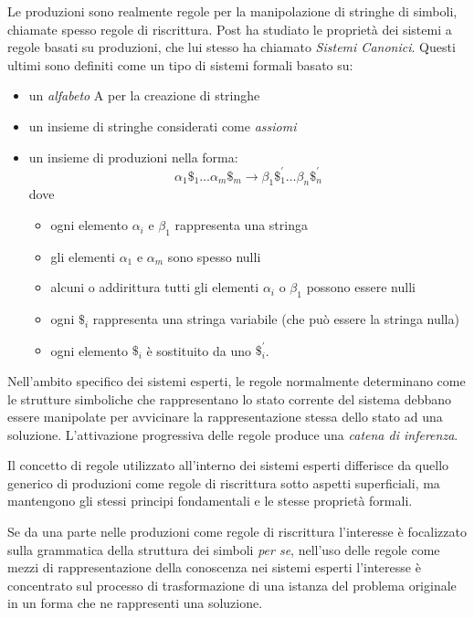 Le produzioni sono realmente regole per la manipolazione di stringhe di simboli, chiamate spesso regole di riscrittura. Post \cite{post1943} ha studiato le proprietà dei sistemi a regole basati su produzioni, che lui stesso ha chiamato \emph{Sistemi Canonici}. Questi ultimi sono definiti come un tipo di sistemi formali basato su:

\begin{itemize}
	\item un \emph{alfabeto} A per la creazione di stringhe
	\item un insieme di stringhe considerati come \emph{assiomi}
	\item un insieme di produzioni nella forma: 
	\[
	\alpha_1\$_1 \dots \alpha_m\$_m \rightarrow \beta_1\$_1^{'} \dots \beta_n\$_n^{'}
	\]	
	dove
	\begin{itemize}
		\item ogni elemento $\alpha_i$ e $\beta_1$ rappresenta una stringa
		\item gli elementi $\alpha_1$ e $\alpha_m$ sono spesso nulli
		\item alcuni o addirittura tutti gli elementi $\alpha_i$ o $\beta_1$ possono essere nulli
		\item ogni $\$_i$ rappresenta una stringa variabile (che può essere la stringa nulla)
		\item ogni elemento $\$_i$ è sostituito da uno $\$_i^{'}$.
	\end{itemize}
\end{itemize}

Nell'ambito specifico dei sistemi esperti, le regole normalmente determinano come le strutture simboliche che rappresentano lo stato corrente del sistema debbano essere manipolate per avvicinare la rappresentazione stessa dello stato ad una soluzione. L'attivazione progressiva delle regole produce una \emph{catena di inferenza}.

Il concetto di regole utilizzato  all'interno dei sistemi esperti differisce da quello generico di produzioni come regole di riscrittura sotto aspetti superficiali, ma mantengono gli stessi principi fondamentali e le stesse proprietà formali.

Se da una parte nelle produzioni come regole di riscrittura l'interesse è focalizzato sulla grammatica della struttura dei simboli \emph{per se}, nell'uso delle regole come mezzi di rappresentazione della conoscenza nei sistemi esperti l'interesse è concentrato sul processo di trasformazione di una istanza del problema originale in un forma che ne rappresenti una soluzione.

